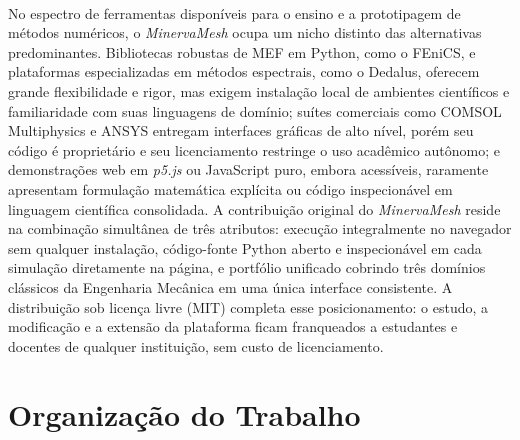 \paragraph{}No espectro de ferramentas disponíveis para o ensino e a prototipagem de métodos numéricos, o \textit{MinervaMesh} ocupa um nicho distinto das alternativas predominantes. Bibliotecas robustas de MEF em Python, como o FEniCS, e plataformas especializadas em métodos espectrais, como o Dedalus, oferecem grande flexibilidade e rigor, mas exigem instalação local de ambientes científicos e familiaridade com suas linguagens de domínio; suítes comerciais como COMSOL Multiphysics e ANSYS entregam interfaces gráficas de alto nível, porém seu código é proprietário e seu licenciamento restringe o uso acadêmico autônomo; e demonstrações web em \textit{p5.js} ou JavaScript puro, embora acessíveis, raramente apresentam formulação matemática explícita ou código inspecionável em linguagem científica consolidada. A contribuição original do \textit{MinervaMesh} reside na combinação simultânea de três atributos: execução integralmente no navegador sem qualquer instalação, código-fonte Python aberto e inspecionável em cada simulação diretamente na página, e portfólio unificado cobrindo três domínios clássicos da Engenharia Mecânica em uma única interface consistente. A distribuição sob licença livre (MIT) completa esse posicionamento: o estudo, a modificação e a extensão da plataforma ficam franqueados a estudantes e docentes de qualquer instituição, sem custo de licenciamento.

\section{Organização do Trabalho}

